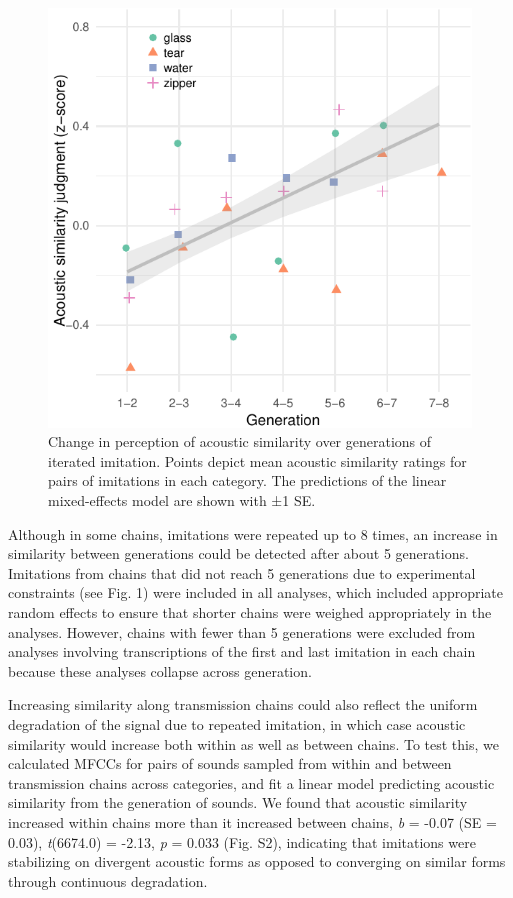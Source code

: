 \documentclass[english,floatsintext,man]{apa6}
\theoremstyle{definition}
\theoremstyle{definition}
\theoremstyle{definition}
\theoremstyle{remark}
\begin{document}
\begin{figure}
\centering
\includegraphics{fig2-1.pdf}
\caption{\label{fig:fig2}Change in perception of acoustic similarity over
generations of iterated imitation. Points depict mean acoustic
similarity ratings for pairs of imitations in each category. The
predictions of the linear mixed-effects model are shown with ±1 SE.}
\end{figure}

Although in some chains, imitations were repeated up to 8 times, an
increase in similarity between generations could be detected after about
5 generations. Imitations from chains that did not reach 5 generations
due to experimental constraints (see Fig. 1) were included in all
analyses, which included appropriate random effects to ensure that
shorter chains were weighed appropriately in the analyses. However,
chains with fewer than 5 generations were excluded from analyses
involving transcriptions of the first and last imitation in each chain
because these analyses collapse across generation.

Increasing similarity along transmission chains could also reflect the
uniform degradation of the signal due to repeated imitation, in which
case acoustic similarity would increase both within as well as between
chains. To test this, we calculated MFCCs for pairs of sounds sampled
from within and between transmission chains across categories, and fit a
linear model predicting acoustic similarity from the generation of
sounds. We found that acoustic similarity increased within chains more
than it increased between chains, \emph{b} = -0.07 (SE = 0.03),
\emph{t}(6674.0) = -2.13, \emph{p} = 0.033 (Fig. S2), indicating that
imitations were stabilizing on divergent acoustic forms as opposed to
converging on similar forms through continuous degradation.
\end{document}
